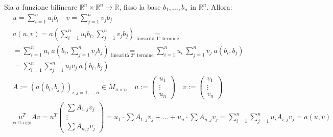\documentclass{article}
\begin{document}
Sia $a$ funzione bilineare $\mathbb R^n\times\mathbb R^n\to\mathbb R$, fisso la base $b_1,\dots,b_n$ in $\mathbb{R}^n$. Allora:
\begin{align*}
     & u=\sum_{i=1}^{n}u_ib_i\quad v=\sum_{j=1}^{n}v_jb_j                                                                                                               \\
     & a(u,v)=a\left(\sum_{i=1}^{n}u_ib_i,\sum_{j=1}^{n}v_jb_j\right)\underset{\text{linearità $1°$ termine}}{=}                                                        \\
     & =\sum_{i=1}^{n}u_i\ a\left(b_i,\sum_{j=1}^{n}v_jb_j\right)\underset{\text{linearità $2°$ termine}}{=}\sum_{i=1}^{n}u_i\ \sum_{j=1}^{n}v_j\ a\left(b_i,b_j\right) \\
     & =\sum_{i=1}^{n}\sum_{j=1}^{n}u_iv_j\ a\left(b_i,b_j\right)                                                                                                       \\
     & A:=\left(a\left(b_i,b_j\right)\right)_{i,j=1,\dots,n}\in M_{n\times n}\quad u:=\begin{pmatrix}
                                                                                          u_1    \\
                                                                                          \vdots \\
                                                                                          u_n
                                                                                      \end{pmatrix}\quad v:=\begin{pmatrix}
                                                                                                                v_1    \\
                                                                                                                \vdots \\
                                                                                                                v_n
                                                                                                            \end{pmatrix}                                              \\
     & \underset{\text{vett riga}}{u^T}Av=u^T\begin{pmatrix}
                                                 \sum A_{1,j}v_j \\
                                                 \vdots          \\
                                                 \sum A_{n,j}v_j
                                             \end{pmatrix}=u_1\cdot\sum A_{1,j}v_j+\dots+u_n\cdot\sum A_{n,j}v_j=\sum_{i=1}^n \sum_{j=1}^{n} u_iA_{i,j}v_j=a(u,v)
\end{align*}
\end{document}
